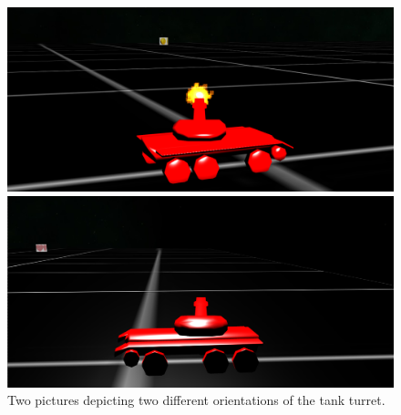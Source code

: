 \documentclass[14pt]{article}
\begin{document}
\begin{figure}[H]
\begin{minipage}[t]{0.45\textwidth}
\center
\includegraphics[width=\textwidth]{images/turret1.png}
\end{minipage}
\hfill
\begin{minipage}[t]{0.45\textwidth}
\center
\includegraphics[width=\textwidth]{images/turret2.png}
\end{minipage}
\caption{Two pictures depicting two different orientations of the tank turret.}
\label{img:turretOrientation}
\end{figure}
\end{document}
